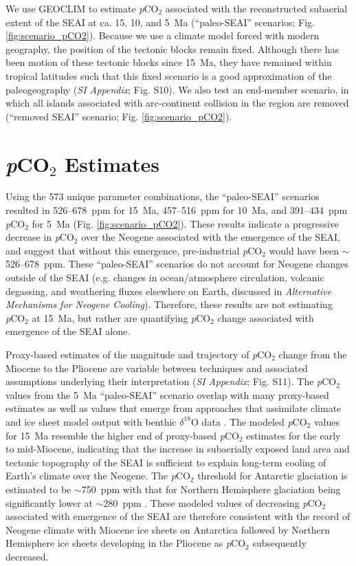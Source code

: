\documentclass[9pt,twocolumn,twoside,lineno]{pnas-new}
\newcommand{\dO}{$\delta^{18}$O\xspace}
\newcommand{\pCOtwo}{\textit{p}CO$_{2}$\xspace}
\newcommand{\SI}{\textit{SI Appendix}\xspace}
\begin{document}
We use GEOCLIM to estimate \pCOtwo associated with the reconstructed subaerial extent of the SEAI at ca. 15, 10, and 5~Ma (``paleo-SEAI'' scenarios; Fig. \ref{fig:scenario_pCO2}). Because we use a climate model forced with modern geography, the position of the tectonic blocks remain fixed. Although there has been motion of these tectonic blocks since 15~Ma, they have remained within tropical latitudes such that this fixed scenario is a good approximation of the paleogeography (\SI; Fig. S10). We also test an end-member scenario, in which all islands associated with arc-continent collision in the region are removed (``removed SEAI'' scenario; Fig. \ref{fig:scenario_pCO2}).

\section*{\pCOtwo Estimates}

Using the 573 unique parameter combinations, the ``paleo-SEAI'' scenarios resulted in 526--678~ppm for 15~Ma, 457--516~ppm for 10~Ma, and 391--434~ppm \pCOtwo for 5~Ma (Fig. \ref{fig:scenario_pCO2}). These results indicate a progressive decrease in \pCOtwo over the Neogene associated with the emergence of the SEAI, and suggest that without this emergence, pre-industrial \pCOtwo would have been $\sim$526--678~ppm. These ``paleo-SEAI'' scenarios do not account for Neogene changes outside of the SEAI (e.g. changes in ocean/atmosphere circulation, volcanic degassing, and weathering fluxes elsewhere on Earth, discussed in \textit{Alternative Mechanisms for Neogene Cooling}). Therefore, these results are not estimating \pCOtwo at 15~Ma, but rather are quantifying \pCOtwo change associated with emergence of the SEAI alone.

Proxy-based estimates of the magnitude and trajectory of \pCOtwo change from the Miocene to the Pliocene are variable between techniques and associated assumptions underlying their interpretation (\SI; Fig. S11). The \pCOtwo values from the 5~Ma ``paleo-SEAI'' scenario overlap with many proxy-based estimates \cite{Foster2017a} as well as values that emerge from approaches that assimilate climate and ice sheet model output with benthic \dO data \cite{van-de-Wal2011a, Berends2020a}. The modeled \pCOtwo values for 15~Ma resemble the higher end of proxy-based \pCOtwo estimates for the early to mid-Miocene, indicating that the increase in subaerially exposed land area and tectonic topography of the SEAI is sufficient to explain long-term cooling of Earth's climate over the Neogene. The \pCOtwo threshold for Antarctic glaciation is estimated to be $\sim$750~ppm with that for Northern Hemisphere glaciation being significantly lower at $\sim$280~ppm \cite{DeConto2008a}. These modeled values of decreasing \pCOtwo associated with emergence of the SEAI are therefore consistent with the record of Neogene climate with Miocene ice sheets on Antarctica \cite{Sugden1995a} followed by Northern Hemisphere ice sheets developing in the Pliocene \cite{Haug2005a} as \pCOtwo subsequently decreased.
\end{document}
